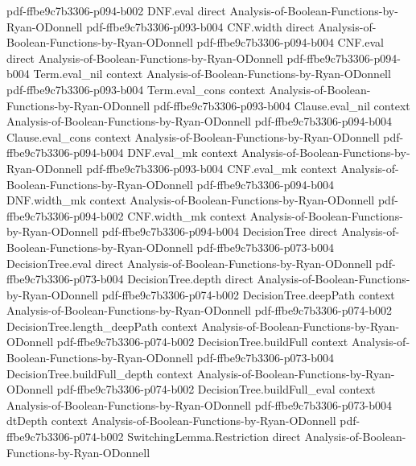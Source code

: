 \begin{theorem}
  {pdf-ffbe9c7b3306-p094-b002}
\proofstep
  {DNF.eval}
  {direct}
  {Analysis-of-Boolean-Functions-by-Ryan-ODonnell}
  {pdf-ffbe9c7b3306-p093-b004}
\proofstep
  {CNF.width}
  {direct}
  {Analysis-of-Boolean-Functions-by-Ryan-ODonnell}
  {pdf-ffbe9c7b3306-p094-b004}
\proofstep
  {CNF.eval}
  {direct}
  {Analysis-of-Boolean-Functions-by-Ryan-ODonnell}
  {pdf-ffbe9c7b3306-p094-b004}
\proofstep
  {Term.eval_nil}
  {context}
  {Analysis-of-Boolean-Functions-by-Ryan-ODonnell}
  {pdf-ffbe9c7b3306-p093-b004}
\proofstep
  {Term.eval_cons}
  {context}
  {Analysis-of-Boolean-Functions-by-Ryan-ODonnell}
  {pdf-ffbe9c7b3306-p093-b004}
\proofstep
  {Clause.eval_nil}
  {context}
  {Analysis-of-Boolean-Functions-by-Ryan-ODonnell}
  {pdf-ffbe9c7b3306-p094-b004}
\proofstep
  {Clause.eval_cons}
  {context}
  {Analysis-of-Boolean-Functions-by-Ryan-ODonnell}
  {pdf-ffbe9c7b3306-p094-b004}
\proofstep
  {DNF.eval_mk}
  {context}
  {Analysis-of-Boolean-Functions-by-Ryan-ODonnell}
  {pdf-ffbe9c7b3306-p093-b004}
\proofstep
  {CNF.eval_mk}
  {context}
  {Analysis-of-Boolean-Functions-by-Ryan-ODonnell}
  {pdf-ffbe9c7b3306-p094-b004}
\proofstep
  {DNF.width_mk}
  {context}
  {Analysis-of-Boolean-Functions-by-Ryan-ODonnell}
  {pdf-ffbe9c7b3306-p094-b002}
\proofstep
  {CNF.width_mk}
  {context}
  {Analysis-of-Boolean-Functions-by-Ryan-ODonnell}
  {pdf-ffbe9c7b3306-p094-b004}
\proofstep
  {DecisionTree}
  {direct}
  {Analysis-of-Boolean-Functions-by-Ryan-ODonnell}
  {pdf-ffbe9c7b3306-p073-b004}
\proofstep
  {DecisionTree.eval}
  {direct}
  {Analysis-of-Boolean-Functions-by-Ryan-ODonnell}
  {pdf-ffbe9c7b3306-p073-b004}
\proofstep
  {DecisionTree.depth}
  {direct}
  {Analysis-of-Boolean-Functions-by-Ryan-ODonnell}
  {pdf-ffbe9c7b3306-p074-b002}
\proofstep
  {DecisionTree.deepPath}
  {context}
  {Analysis-of-Boolean-Functions-by-Ryan-ODonnell}
  {pdf-ffbe9c7b3306-p074-b002}
\proofstep
  {DecisionTree.length_deepPath}
  {context}
  {Analysis-of-Boolean-Functions-by-Ryan-ODonnell}
  {pdf-ffbe9c7b3306-p074-b002}
\proofstep
  {DecisionTree.buildFull}
  {context}
  {Analysis-of-Boolean-Functions-by-Ryan-ODonnell}
  {pdf-ffbe9c7b3306-p073-b004}
\proofstep
  {DecisionTree.buildFull_depth}
  {context}
  {Analysis-of-Boolean-Functions-by-Ryan-ODonnell}
  {pdf-ffbe9c7b3306-p074-b002}
\proofstep
  {DecisionTree.buildFull_eval}
  {context}
  {Analysis-of-Boolean-Functions-by-Ryan-ODonnell}
  {pdf-ffbe9c7b3306-p073-b004}
\proofstep
  {dtDepth}
  {context}
  {Analysis-of-Boolean-Functions-by-Ryan-ODonnell}
  {pdf-ffbe9c7b3306-p074-b002}
\proofstep
  {SwitchingLemma.Restriction}
  {direct}
  {Analysis-of-Boolean-Functions-by-Ryan-ODonnell}

\end{theorem}
